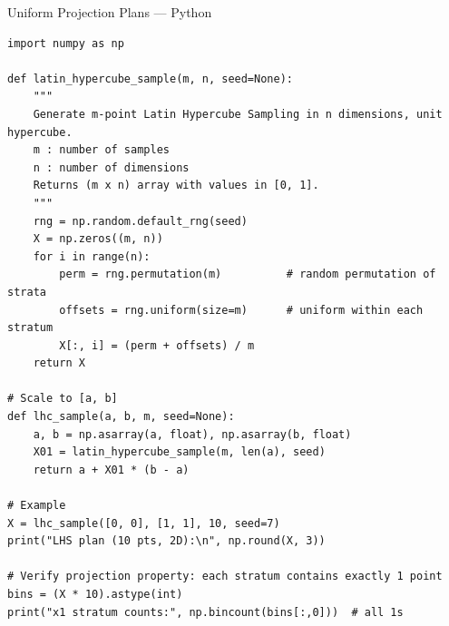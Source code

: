 \documentclass[aspectratio=169,10pt]{beamer}
\begin{document}
\begin{frame}[fragile]{Uniform Projection Plans --- Python}
  \begin{lstlisting}[style=python, caption={Latin Hypercube Sampling (Python/NumPy)}]
import numpy as np

def latin_hypercube_sample(m, n, seed=None):
    """
    Generate m-point Latin Hypercube Sampling in n dimensions, unit hypercube.
    m : number of samples
    n : number of dimensions
    Returns (m x n) array with values in [0, 1].
    """
    rng = np.random.default_rng(seed)
    X = np.zeros((m, n))
    for i in range(n):
        perm = rng.permutation(m)          # random permutation of strata
        offsets = rng.uniform(size=m)      # uniform within each stratum
        X[:, i] = (perm + offsets) / m
    return X

# Scale to [a, b]
def lhc_sample(a, b, m, seed=None):
    a, b = np.asarray(a, float), np.asarray(b, float)
    X01 = latin_hypercube_sample(m, len(a), seed)
    return a + X01 * (b - a)

# Example
X = lhc_sample([0, 0], [1, 1], 10, seed=7)
print("LHS plan (10 pts, 2D):\n", np.round(X, 3))

# Verify projection property: each stratum contains exactly 1 point
bins = (X * 10).astype(int)
print("x1 stratum counts:", np.bincount(bins[:,0]))  # all 1s
  \end{lstlisting}
\end{frame}
\end{document}
